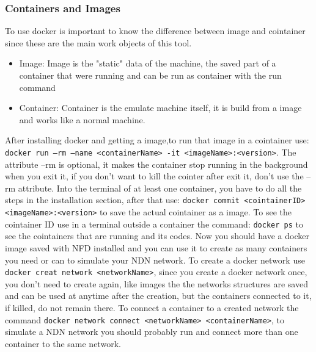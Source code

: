 \documentclass[11pt,conference]{./IEEEtran}
\begin{document}
\subsubsection{Containers and Images}
To use docker is important to know the difference between image and cointainer since these are the main work objects of this tool.
\begin{itemize}
 \item Image: Image is the "static" data of the machine, the saved part of a container that were running and can be run as container with the run command
 \item Container: Container is the emulate machine itself, it is build from a image and works like a normal machine.
\end{itemize}

After installing docker and getting a image,to run that image in a cointainer use: \texttt{docker run --rm --name <containerName> -it <imageName>:<version>}. The attribute --rm is optional, it makes the container stop running in the background when you exit it, if you don't want to kill the cointer after exit it, don't use the --rm attribute.
Into the terminal of at least one container, you have to do all the steps in the installation section, after that use:  \texttt{docker commit <cointainerID>  <imageName>:<version>}  to save the actual cointainer as a image. 
To see the cointainer ID use in a terminal outside a container the command: \texttt{docker ps} to see the cointainers that are running and its codes.
Now you should have a docker image saved with NFD installed and you can use it to create as many containers you need or can to simulate your NDN network.
To create a docker network use \texttt{docker creat network <networkName>}, since you create a docker network once, you don't need to create again, like images the the networks structures are saved and can be used at anytime after the creation, but the containers connected to it, if killed, do not remain there.
To connect a container to a created network the command \texttt{docker network connect <networkName> <containerName>}, to simulate a NDN network you should probably run and connect more than one container to the same network.
\end{document}
